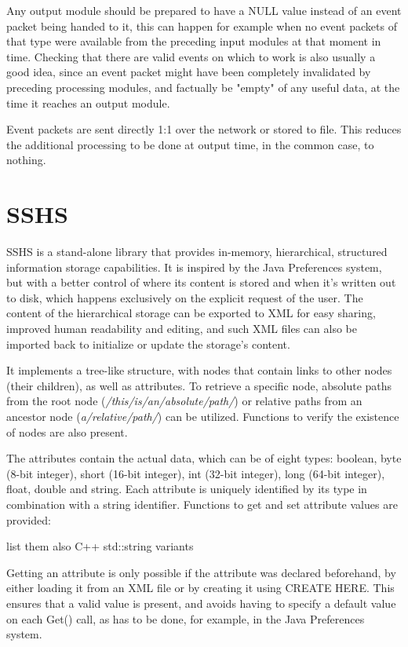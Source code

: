 \documentclass[a4paper,12pt]{report}
\begin{document}
Any output module should be prepared to have a NULL value instead of an event packet being handed to it, this can happen for example when no event packets of that type were available from the preceding input modules at that moment in time.
Checking that there are valid events on which to work is also usually a good idea, since an event packet might have been completely invalidated by preceding processing modules, and factually be "empty" of any useful data, at the time it reaches an output module.

Event packets are sent directly 1:1 over the network or stored to file. This reduces the additional processing to be done at output time, in the common case, to nothing.

\section{SSHS} \label{subsec:sshs}

SSHS is a stand-alone library that provides in-memory, hierarchical, structured information storage capabilities.
It is inspired by the Java Preferences system, but with a better control of where its content is stored and when it's written out to disk, which happens exclusively on the explicit request of the user.
The content of the hierarchical storage can be exported to XML for easy sharing, improved human readability and editing, and such XML files can also be imported back to initialize or update the storage's content.

It implements a tree-like structure, with nodes that contain links to other nodes (their children), as well as attributes.
To retrieve a specific node, absolute paths from the root node (\emph{/this/is/an/absolute/path/}) or relative paths from an ancestor node (\emph{a/relative/path/}) can be utilized. Functions to verify the existence of nodes are also present.

The attributes contain the actual data, which can be of eight types: boolean, byte (8-bit integer), short (16-bit integer), int (32-bit integer), long (64-bit integer), float, double and string.
Each attribute is uniquely identified by its type in combination with a string identifier.
Functions to get and set attribute values are provided:

list them
also C++ std::string variants

Getting an attribute is only possible if the attribute was declared beforehand, by either loading it from an XML file or by creating it using CREATE HERE.
This ensures that a valid value is present, and avoids having to specify a default value on each Get() call, as has to be done, for example, in the Java Preferences system.
\end{document}
